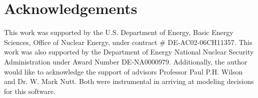 \section{Acknowledgements}
This work was supported by the U.S.  Department of Energy, Basic Energy
Sciences, Office of Nuclear Energy, under contract \# DE-AC02-06CH11357.  This
work was also supported by the Department of Energy National Nuclear Security
Administration under Award Number DE‐NA0000979. Additionally, the author would
like to acknowledge the support of advisors Professor Paul P.H. Wilson and Dr.
W. Mark Nutt. Both were instrumental in arriving at
modeling decisions for this software.

